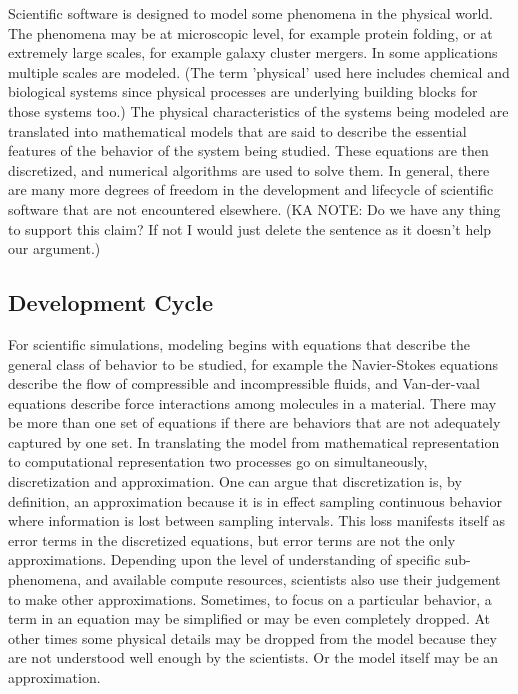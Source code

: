 \label{sec:lifecycle} 
Scientific software is designed to model some phenomena in the
physical world. The phenomena may be at microscopic level, for example
protein folding, or at extremely large scales, for example galaxy cluster
mergers.  In some applications multiple scales are modeled.  (The term 'physical' used here includes chemical and
biological systems since physical processes are underlying building
blocks for those systems too.) The physical characteristics of the systems being modeled are
translated into mathematical models that are said to describe the
essential features of the behavior of the system being
studied. These equations are then discretized, and numerical algorithms
are used to solve them. In general, there are many more degrees of
freedom in the development and lifecycle of scientific software
that are not encountered elsewhere. (KA NOTE: Do we have any thing to support this claim?  If not I would just delete the sentence as it doesn't help our argument.)

\subsection{Development Cycle}
\label{sec:dev-cycle}
For scientific simulations, modeling begins with equations that describe the
general class of behavior to be studied, for example the Navier-Stokes
equations describe the flow of compressible and incompressible
fluids, and Van-der-vaal equations describe force interactions among
molecules in a material. There may be more than one set of equations
if there are behaviors that are not adequately captured by one set.
In translating the model from mathematical representation to
computational representation two processes go on simultaneously,
discretization and approximation. One can argue that discretization is,
by definition, an approximation because it is in effect sampling
continuous behavior where information is lost between sampling
intervals. This loss manifests itself as error terms in the discretized
equations, but error terms are not the only
approximations. Depending upon the level of understanding of specific
sub-phenomena, and available compute resources, scientists also 
use their judgement to make other approximations. Sometimes, to focus on a
particular behavior, a term in an equation may be simplified or may be even completely
dropped. At other times some physical details may be dropped
from the model because they are not understood well enough by the
scientists.  Or the model itself may be an approximation.  

